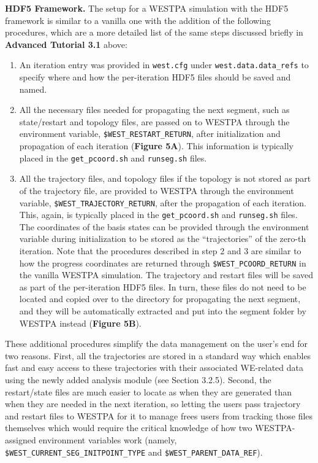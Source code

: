 \textbf{HDF5 Framework.} The setup for a WESTPA simulation with the HDF5 framework is similar to a vanilla one with the addition of the following procedures, which are a more detailed list of the same steps discussed briefly in \textbf{Advanced Tutorial 3.1} above:
\begin{enumerate}
    \item An iteration entry was provided in \verb|west.cfg| under \verb|west.data.data_refs| to specify where and how the per-iteration HDF5 files should be saved and named. 
    \item All the necessary files needed for propagating the next segment, such as state/restart and topology files, are passed on to WESTPA through the environment variable, \verb|$WEST_RESTART_RETURN|, after initialization and propagation of each iteration (\textbf{Figure 5A}). 
    This information is typically placed in the \verb|get_pcoord.sh| and \verb|runseg.sh| files. 
    \item All the trajectory files, and topology files if the topology is not stored as part of the trajectory file, are provided to WESTPA through the environment variable, \verb|$WEST_TRAJECTORY_RETURN|, after the propagation of each iteration. 
    This, again, is typically placed in the \verb|get_pcoord.sh| and \verb|runseg.sh| files. 
    The coordinates of the basis states can be provided through the environment variable during initialization to be stored as the “trajectories” of the zero-th iteration. 
    Note that the procedures described in step 2 and 3 are similar to how the progress coordinates are returned through \verb|$WEST_PCOORD_RETURN| in the vanilla WESTPA simulation. 
    The trajectory and restart files will be saved as part of the per-iteration HDF5 files. 
    In turn, these files do not need to be located and copied over to the directory for propagating the next segment, and they will be automatically extracted and put into the segment folder by WESTPA instead (\textbf{Figure 5B}).
\end{enumerate}

These additional procedures simplify the data management on the user’s end for two reasons. 
First, all the trajectories are stored in a standard way which enables fast and easy access to these trajectories with their associated WE-related data using the newly added analysis module (see Section 3.2.5). 
Second, the restart/state files are much easier to locate as when they are generated than when they are needed in the next iteration, so letting the users pass trajectory and restart files to WESTPA for it to manage frees users from tracking those files themselves which would require the critical knowledge of how two WESTPA-assigned environment variables work (namely, \verb|$WEST_CURRENT_SEG_INITPOINT_TYPE| and \verb|$WEST_PARENT_DATA_REF|). 

